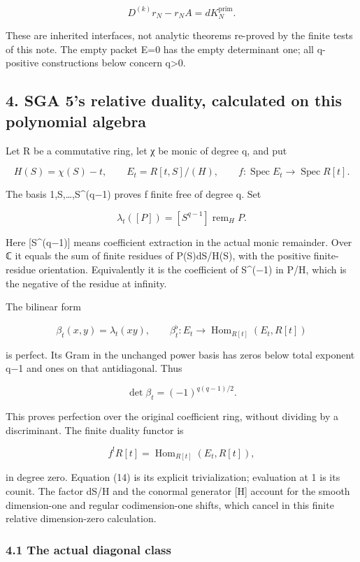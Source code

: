 \[
D^{(k)}r_N-r_NA=dK_N^{\mathrm{prim}}.
\tag{11}
\]

These are inherited interfaces, not analytic theorems re-proved by the finite tests of this note. The empty packet E=0 has the empty determinant one; all q-positive constructions below concern q\textgreater0.

\subsection{4. SGA 5's relative duality, calculated on this polynomial algebra}\label{endpoint-sga_trace_period--sga-5s-relative-duality-calculated-on-this-polynomial-algebra}

Let R be a commutative ring, let χ be monic of degree q, and put

\[
H(S)=\chi(S)-t,\qquad E_t=R[t,S]/(H),\qquad
f:\operatorname{Spec}E_t\longrightarrow\operatorname{Spec}R[t].
\tag{12}
\]

The basis 1,S,\ldots,S\^{}(q−1) proves f finite free of degree q. Set

\[
\lambda_t([P])=[S^{q-1}]\operatorname{rem}_{H}P.
\tag{13}
\]

Here {[}S\^{}(q−1){]} means coefficient extraction in the actual monic remainder. Over ℂ it equals the sum of finite residues of P(S)dS/H(S), with the positive finite-residue orientation. Equivalently it is the coefficient of S\^{}(−1) in P/H, which is the negative of the residue at infinity.

The bilinear form

\[
\beta_t(x,y)=\lambda_t(xy),\qquad
\beta_t^\flat:E_t\longrightarrow\operatorname{Hom}_{R[t]}(E_t,R[t])
\tag{14}
\]

is perfect. Its Gram in the unchanged power basis has zeros below total exponent q−1 and ones on that antidiagonal. Thus

\[
\det\beta_t=(-1)^{q(q-1)/2}.
\tag{15}
\]

This proves perfection over the original coefficient ring, without dividing by a discriminant. The finite duality functor is

\[
f^!R[t]=\operatorname{Hom}_{R[t]}(E_t,R[t]),
\tag{16}
\]

in degree zero. Equation (14) is its explicit trivialization; evaluation at 1 is its counit. The factor dS/H and the conormal generator {[}H{]} account for the smooth dimension-one and regular codimension-one shifts, which cancel in this finite relative dimension-zero calculation.

\subsubsection{4.1 The actual diagonal class}\label{endpoint-sga_trace_period--the-actual-diagonal-class}

